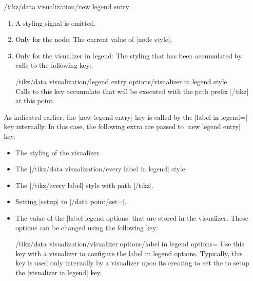 \begin{key}{/tikz/data visualization/new legend entry=}
\begin{enumerate}
            \begin{key}{/tikz/data visualization/legend entry options/setup}
                Some code to be executed at this point. Mostly, it is used to
                setup attributes for style sheets.
            \end{key}
        \item A styling signal is emitted.
        \item Only for the node: The current value of |node style|.
        \item Only for the visualizer in legend: The styling that has been
            accumulated by calls to the following key:
            \begin{stylekey}{/tikz/data visualization/legend entry options/visualizer in legend style=\\}
                Calls to this key accumulate  that will be
                executed with the path prefix |/tikz| at this point.
            \end{stylekey}
    \end{enumerate}
\end{key}

As indicated earlier, the |new legend entry| key is called by the
|label in legend=| key internally. In this case, the following
extra  are passed to |new legend entry| key:
%
\begin{itemize}
    \item The styling of the visualizer.
    \item The |/tikz/data visualization/every label in legend| style.
    \item The |/tikz/every label| style with path |/tikz|.
    \item Setting |setup| to |/data point/set=|.
    \item The value of the |label legend options| that are stored in the
        visualizer. These options can be changed using the following key:
        \begin{key}{/tikz/data visualization/visualizer options/label in legend options=}
            Use this key with a visualizer to configure the label in legend
            options. Typically, this key is used only internally by a
            visualizer upon its creating to set the  to setup the
            |visualizer in legend| key.
        \end{key}
\end{itemize}


